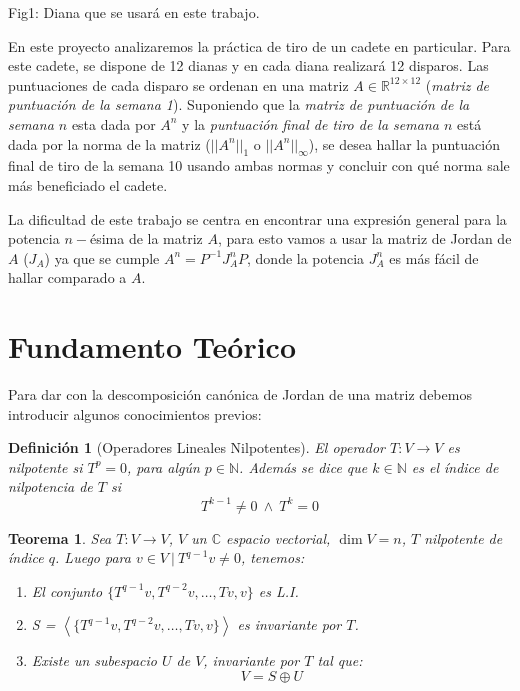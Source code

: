 \documentclass[12pt,a4paper]{article}
\newtheorem{mydef}{Definici\'on}[section]
\newtheorem{mytheo}{Teorema}[section]
\begin{document}
\begin{multicols}{2}
\begin{center}
		Fig1: Diana que se usará en este trabajo.
	\end{center}
	\noindent En este proyecto analizaremos la práctica de tiro de un cadete en particular. Para este cadete, se dispone de 12 dianas  y en cada diana realizará 12 disparos. Las puntuaciones de cada disparo se ordenan en una matriz $A \in \mathbb{R}^{12\times 12}$ (\textit{matriz de puntuación de la semana 1}). Suponiendo que la \textit{matriz de puntuación de la semana $n$ }esta dada por $A^n$ y la \textit{puntuación final de tiro de la semana $n$ }está dada por la norma de la matriz ($||A^n||_1\text{ o }||A^n||_\infty$), se desea hallar la puntuación final de tiro de la semana 10 usando ambas normas y concluir con qué norma sale más beneficiado el cadete.
	
	\noindent La dificultad de este trabajo se centra en encontrar una expresión general para la potencia $n-$ésima de la matriz $A$, para esto vamos a usar la matriz de Jordan de $A$ ($J_A$) ya que se cumple $A^n=P^{-1}J^n_AP$, donde la potencia  $J^n_A$ es más fácil de hallar comparado a $A$.
	
	
	\section{Fundamento Teórico}
	
	\noindent Para dar con la descomposición canónica de Jordan de una matriz debemos introducir algunos conocimientos previos:
	
	\begin{mydef}[Operadores Lineales Nilpotentes]
		El operador $T:V\to V$ es nilpotente si $T^{p} = 0$, para algún $p\in\mathbb{N}$. Además se dice que $k\in\mathbb{N}$ es el índice de nilpotencia de $T$ si $$T^{k-1}\neq 0 \ \wedge \ T^{k} = 0$$
	\end{mydef}
	
	\begin{mytheo}\label{theo_nilpotentes}  
		\noindent Sea $T:V\to V$, $V$ un $\mathbb{C}$ espacio vectorial, $\dim V = n$, $T$ nilpotente de índice $q$. Luego para $v\in V \ | \ T^{q-1}v\neq 0$, tenemos:
		\begin{enumerate}
			\item El conjunto $\{T^{q-1}v, T^{q-2}v,\ldots,Tv, v\}$ es L.I.
			\item S = $\left<\{T^{q-1}v, T^{q-2}v,\ldots,Tv, v\}\right>$ es invariante por $T$.
			\item Existe un subespacio $U$ de $V$, invariante por $T$ tal que:
			$$V = S\oplus U$$
		\end{enumerate}
	\end{mytheo}
	

\end{multicols}
\end{document}
